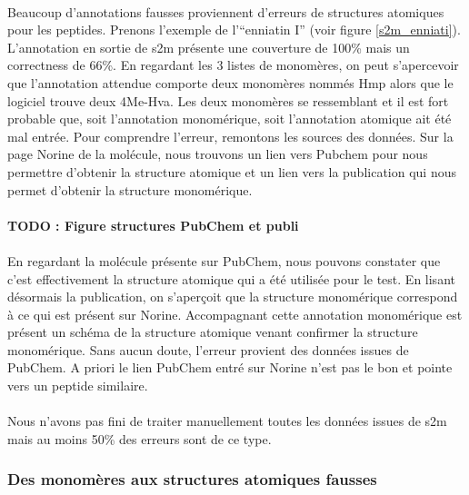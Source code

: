 \documentclass[12pt,french,twoside]{report}
\begin{document}
\paragraph{}Beaucoup d'annotations fausses proviennent d'erreurs de structures atomiques pour les peptides.
Prenons l'exemple de l'``enniatin I'' (voir figure \ref{s2m_enniati}).
L'annotation en sortie de s2m présente une couverture de 100\% mais un correctness de 66\%.
En regardant les 3 listes de monomères, on peut s'apercevoir que l'annotation attendue comporte deux monomères nommés Hmp alors que le logiciel trouve deux 4Me-Hva.
Les deux monomères se ressemblant et il est fort probable que, soit l'annotation monomérique, soit l'annotation atomique ait été mal entrée.
Pour comprendre l'erreur, remontons les sources des données.
Sur la page Norine de la molécule, nous trouvons un lien vers Pubchem pour nous permettre d'obtenir la structure atomique et un lien vers la publication qui nous permet d'obtenir la structure monomérique.

\paragraph{TODO : Figure structures PubChem et publi}

\paragraph{}En regardant la molécule présente sur PubChem, nous pouvons constater que c'est effectivement la structure atomique qui a été utilisée pour le test.
En lisant désormais la publication, on s'aperçoit que la structure monomérique correspond à ce qui est présent sur Norine.
Accompagnant cette annotation monomérique est présent un schéma de la structure atomique venant confirmer la structure monomérique.
Sans aucun doute, l'erreur provient des données issues de PubChem.
A priori le lien PubChem entré sur Norine n'est pas le bon et pointe vers un peptide similaire.

\paragraph{}Nous n'avons pas fini de traiter manuellement toutes les données issues de s2m mais au moins 50\% des erreurs sont de ce type.


\subsubsection{Des monomères aux structures atomiques fausses}
\end{document}
